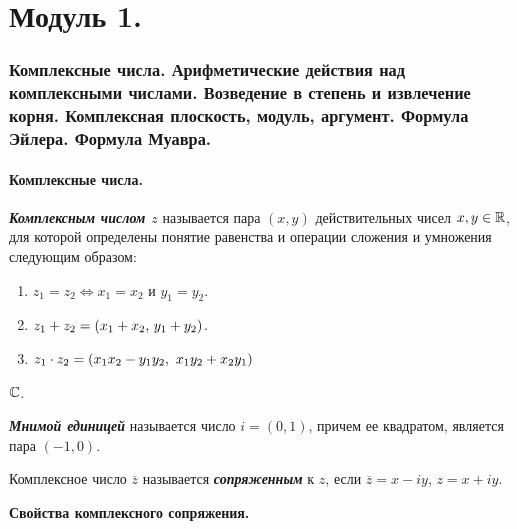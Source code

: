 \Hide

\part{Модуль 1.}

\section{
    Комплексные числа. Арифметические действия над комплексными числами. Возведение в степень и извлечение корня. Комплексная плоскость, модуль, аргумент. Формула Эйлера. Формула Муавра.
}

\subsection{
    Комплексные числа.
}

\begin{definition}
    \textbf{\textit{Комплексным числом $z$}} называется пара $(x, y)$ действительных чисел $x, y \in \mathbb{R}$, для которой определены понятие равенства и операции сложения и умножения следующим образом:
    
    \begin{enumerate}[nosep]
        \item $z_1 = z_2 \iff x_1 = x_2$ и $y_1 = y_2$.
        \item $z_1 + z_2 = (x_1 + x_2, \thinspace y_1 + y_2)$.
        \item $z_1 \cdot z_2 = (x_1x_2 - y_1y_2, \thinspace \thinspace x_1y_2 + x_2y_1)$
    \end{enumerate}
\end{definition}

\begin{designation}
    $\mathbb{C}$.
\end{designation}

\begin{definition}
    \textbf{\textit{Мнимой единицей}} называется число $i = (0, 1)$, причем ее квадратом, является пара $(-1, 0)$.
\end{definition}

\begin{definition}
    Комплексное число $\overline{z}$ называется \textbf{\textit{сопряженным}} к $z$, если $\overline{z} = x - iy$, $z = x + iy$.
\end{definition}

\textbf{Свойства комплексного сопряжения.}

